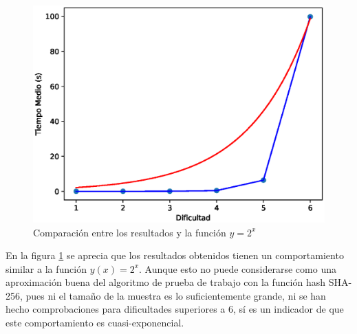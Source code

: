 \begin{figure}[H]
  \includegraphics[width=12cm]{figures/resultados_pow.eps}
  \caption{Comparación entre los resultados y la función $y = 2^x$}
  \label{fig:resultados}
\end{figure}
En la figura \ref{fig:resultados} se aprecia que los resultados obtenidos tienen un comportamiento similar a la función $y(x) = 2^x$. Aunque esto no puede considerarse como una aproximación buena del algoritmo de prueba de trabajo con la función hash SHA-256, pues ni el tamaño de la muestra es lo suficientemente grande, ni se han hecho comprobaciones para dificultades superiores a 6, sí es un indicador de que este comportamiento es cuasi-exponencial.
